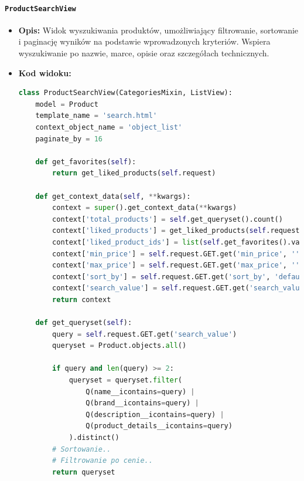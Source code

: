 \documentclass[12pt,a4paper,oneside]{article}
\theoremstyle{definition}
\numberwithin{equation}{section}
\begin{document}
\paragraph{\texttt{ProductSearchView}}
\begin{itemize}
    \item \textbf{Opis:} Widok wyszukiwania produktów, umożliwiający filtrowanie, sortowanie i paginację wyników na podstawie wprowadzonych kryteriów. Wspiera wyszukiwanie po nazwie, marce, opisie oraz szczegółach technicznych.
    \item \textbf{Kod widoku:}
    \begin{lstlisting}[language=Python, caption=ProductSearchView]
class ProductSearchView(CategoriesMixin, ListView):
    model = Product
    template_name = 'search.html'
    context_object_name = 'object_list'
    paginate_by = 16

    def get_favorites(self):
        return get_liked_products(self.request)

    def get_context_data(self, **kwargs):
        context = super().get_context_data(**kwargs)
        context['total_products'] = self.get_queryset().count()
        context['liked_products'] = get_liked_products(self.request)
        context['liked_product_ids'] = list(self.get_favorites().values_list('id', flat=True))
        context['min_price'] = self.request.GET.get('min_price', '')
        context['max_price'] = self.request.GET.get('max_price', '')
        context['sort_by'] = self.request.GET.get('sort_by', 'default')
        context['search_value'] = self.request.GET.get('search_value', '')
        return context

    def get_queryset(self):
        query = self.request.GET.get('search_value')
        queryset = Product.objects.all()

        if query and len(query) >= 2:
            queryset = queryset.filter(
                Q(name__icontains=query) |
                Q(brand__icontains=query) |
                Q(description__icontains=query) |
                Q(product_details__icontains=query)
            ).distinct()
        # Sortowanie..
        # Filtrowanie po cenie..
        return queryset
    \end{lstlisting}


\end{itemize}
\end{document}
